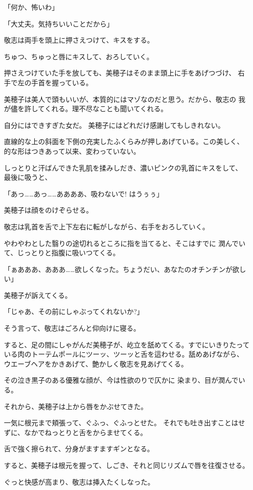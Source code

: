 ﻿\documentclass[
    book,tate,
    line_length=30zw,
    jafontsize=12pt,
    paper=b5j,
    landscape,
    ]{jlreq}
\begin{document}
「何か、怖いわ」

「大丈夫。気持ちいいことだから」

敬志は両手を頭上に押さえつけて、キスをする。

ちゅつ、ちゅっと唇にキスして、おろしていく。

押さえつけていた手を放しても、美穂子はそのまま頭上に手をあげつづけ、
右手で左の手首を握っている。

美穂子は美人で頭もいいが、本質的にはマゾなのだと思う。だから、敬志の
我が儘を許してくれる。理不尽なことも聞いてくれる。

自分にはできすぎた女だ。 美穂子にはどれだけ感謝してもしきれない。

直線的な上の斜面を下側の充実したふくらみが押しあげている。この美しく、
的な形はつきあって以来、変わっていない。

しっとりと汗ばんできた乳肌を揉みしだき、濃いピンクの乳首にキスをして、
最後に吸うと、

「あっ……あっ……ああああ、吸わないで! はうぅぅ」

美穂子は顔をのけぞらせる。

敬志は乳首を舌で上下左右に転がしながら、右手をおろしていく。

やわやわとした翳りの途切れるところに指を当てると、そこはすでに
潤んでいて、じっとりと指腹に吸いつてくる。

「ぁあああ、あああ……欲しくなった。ちょうだい、あなたのオチンチンが欲しい」

美穂子が訴えてくる。

「じゃあ、その前にしゃぶってくれないか?」

そう言って、敬志はごろんと仰向けに寝る。

すると、足の間にしゃがんだ美穂子が、屹立を舐めてくる。すでにいきりたって
いる肉のトーテムポールにツーッ、ツーッと舌を這わせる。舐めあげながら、
ウエーブヘアをかきあげて、艶かしく敬志を見あげてくる。

その泣き黒子のある優雅な顔が、今は性欲のりで仄かに
染まり、目が潤んでいる。

それから、美穂子は上から唇をかぶせてきた。

一気に根元まで頬張って、ぐふっ、ぐふっとせた。
それでも吐き出すことはせずに、なかでねっとりと舌をからませてくる。

舌で強く擦られて、分身がますますギンとなる。

すると、美穂子は根元を握って、しごき、それと同じリズムで唇を往復させる。

ぐっと快感が高まり、敬志は挿入たくしなった。
\end{document}
